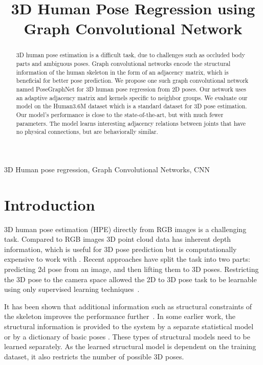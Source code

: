 \documentclass{article}
\title{3D Human Pose Regression using Graph Convolutional Network}
\begin{document}
\maketitle


\begin{abstract}
3D human pose estimation is a difficult task, due to challenges such as occluded body parts and ambiguous poses. Graph convolutional networks encode the structural information of the human skeleton in the form of an adjacency matrix, which is beneficial for better pose prediction. We propose one such graph convolutional network named PoseGraphNet for 3D human pose regression from 2D poses. Our network uses an adaptive adjacency matrix and kernels specific to neighbor groups. We evaluate our model on the Human3.6M dataset which is a standard dataset for 3D pose estimation.
Our model's performance is close to the state-of-the-art, but with much fewer parameters.
The model learns interesting adjacency relations between joints that have no physical connections, but are behaviorally similar.
\end{abstract}
\begin{keywords}
3D Human pose regression, Graph Convolutional Networks, CNN
\end{keywords}
\section{Introduction}
\label{sec:intro}

3D human pose estimation (HPE) directly from RGB images is a challenging task.
Compared to RGB images 3D point cloud data has inherent depth information, which is useful for 3D pose prediction but is computationally expensive to work with \cite{Moon2018,Zimmermann2018}.
Recent approaches \cite{Tome2017,Rayat2018,Cai2019} have split the task into two parts: predicting 2d pose from an image, and then lifting them to 3D poses.
Restricting the 3D pose to the camera space allowed the 2D to 3D pose task to be learnable using only supervised learning techniques~\cite{Martinez2017}.

It has been shown that additional information such as structural constraints of the skeleton improves the performance further~\cite{marin20183d,Cai2019}.
In some earlier work, the structural information is provided to the system by a separate statistical model \cite{Tome2017} or by a dictionary of basic poses \cite{marin20183d}.
These types of structural models need to be learned separately. 
As the learned structural model is dependent on the training dataset, it also restricts the number of possible 3D poses.
\end{document}
